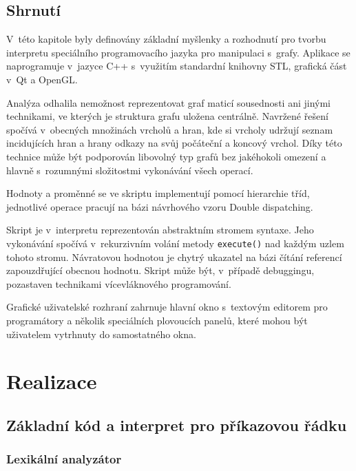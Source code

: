 \documentclass[11pt,twoside,a4paper]{book}
\begin{document}
\section{Shrnutí}

V~této kapitole byly definovány základní myšlenky a rozhodnutí pro tvorbu interpretu spe\-ci\-ál\-ní\-ho programovacího jazyka pro manipulaci s~grafy. Aplikace se naprogramuje v~jazyce C++ s~využitím standardní knihovny STL, grafická část v~Qt a OpenGL.

Analýza odhalila nemožnost reprezentovat graf maticí sousednosti ani jinými technikami, ve kterých je struktura grafu uložena centrálně. Navržené řešení spočívá v~obecných množinách vrcholů a hran, kde si vrcholy udržují seznam incidujících hran a hrany odkazy na svůj počáteční a koncový vrchol. Díky této technice může být podporován libovolný typ grafů bez jakéhokoli omezení a hlavně s~rozumnými složitostmi vykonávání všech operací.

Hodnoty a proměnné se ve skriptu implementují pomocí hierarchie tříd, jednotlivé operace pracují na bázi návrhového vzoru Double dispatching.

Skript je v~interpretu reprezentován abstraktním stromem syntaxe. Jeho vykonávání spočívá v~rekurzivním volání metody \texttt{execute()} nad každým uzlem tohoto stromu. Ná\-vra\-to\-vou hodnotou je chytrý ukazatel na bázi čítání referencí zapouzdřující obecnou hodnotu. Skript může být, v~případě debuggingu, pozastaven technikami ví\-ce\-vlák\-no\-vé\-ho programování.

Grafické uživatelské rozhraní zahrnuje hlavní okno s~textovým editorem pro programátory a několik speciálních plovoucích panelů, které mohou být uživatelem vytrhnuty do samostatného okna.



\chapter{Realizace}


\section{Základní kód a interpret pro příkazovou řádku}

\subsection{Lexikální analyzátor}
\end{document}
